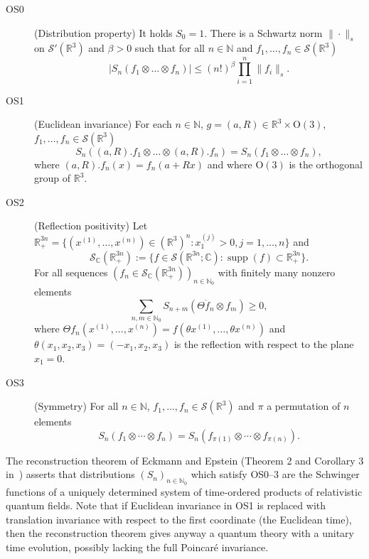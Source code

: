 \documentclass[a4paper,11pt]{article}
\newcommand{\assign}{:=}
\newcommand{\tmop}[1]{\ensuremath{\operatorname{#1}}}
\numberwithin{equation}{section}
\begin{document}
\begin{description}
  \item[OS0] (Distribution property) It holds $S_0 = 1$. There is a Schwartz
  norm $\| \cdot \|_s$ on $\mathcal{S}' (\mathbb{R}^3)$ and $\beta > 0$ such
  that for all $n \in\mathbb{N}$ and $f_1, \ldots, f_n \in \mathcal{S}
  (\mathbb{R}^3)$
  \begin{equation}
    | S_n (f_1 \otimes \ldots \otimes f_n) | \leqslant (n!)^{\beta} \prod_{i =
    1}^n \| f_i \|_s . \label{eq:os-reg}
  \end{equation}
  \item[OS1] (Euclidean invariance) For each $n\in\mathbb{N}$, $g = (a, R) \in
  \mathbb{R}^3 \times \mathrm{O} (3)$, $f_1, \ldots, f_n \in \mathcal{S}
  (\mathbb{R}^3)$
  \[ S_n ((a, R) .f_1 \otimes \ldots \otimes (a, R) .f_n) = S_n (f_1 \otimes
     \ldots \otimes f_n), \]
  where $(a, R) .f_n (x) = f_n (a + R x)$ and where $\mathrm{O}(3)$ is the orthogonal
  group of $\mathbb{R}^3$.
  
  \item[OS2] (Reflection positivity) Let  $\mathbb{R}^{3 n}_{+} = \{ (x^{(1)}, \ldots, x^{(n)}) \in
(\mathbb{R}^3)^n : x_1^{(j)}>0, j=1,\dots,n \}$ and
\[ \mathcal{S}_{\mathbb{C}} (\mathbb{R}^{3 n}_{+}) \assign \{ f \in \mathcal{S}
   (\mathbb{R}^{3 n};\mathbb{C}) : \tmop{supp} (f) \subset \mathbb{R}^{3 n}_{+} \} . \]
 For all sequences $(f_n \in
  \mathcal{S}_{\mathbb{C}} (\mathbb{R}^{3 n}_{+}))_{n \in\mathbb{N}_{0}}$ with
  finitely many nonzero elements
  \begin{equation}
    \sum_{n, m \in\mathbb{N}_{0}} S_{n + m} (\overline{\Theta f_n} \otimes f_m)
    \geqslant 0, \label{eq:OS2}
  \end{equation}
  where $\Theta f_n (x^{(1)}, \ldots, x^{(n)}) = f (\theta x^{(1)}, \ldots,
  \theta x^{(n)})$ and $\theta (x_1, x_{2}, x_3) = (- x_1, x_{2}, x_3)$ is
  the reflection with respect to the plane $x_1 = 0$.
  
  \item[OS3] (Symmetry) For all $n \in\mathbb{N}$, $f_1, \ldots, f_n \in
  \mathcal{S} (\mathbb{R}^3)$ and $\pi$ a permutation of $n$ elements
  \[ S_n (f_1 \otimes \cdots \otimes f_n) = S_n (f_{\pi (1)} \otimes \cdots
     \otimes f_{\pi (n)}) . \]
\end{description}

The reconstruction theorem of Eckmann and Epstein (Theorem 2 and Corollary 3 in~\cite{eckmann_time_ordered_1979}) asserts that
distributions $(S_n)_{n\in\mathbb{N}_{0}}$ which satisfy OS0--3 are the
 Schwinger functions of a uniquely determined system of time-ordered products of relativistic quantum fields.  Note that if Euclidean invariance in OS1 is replaced with translation invariance with respect to the first coordinate (the Euclidean time), then the reconstruction theorem gives anyway a quantum theory with a unitary time evolution, possibly lacking the full Poincar\'e invariance.
  
\end{document}
